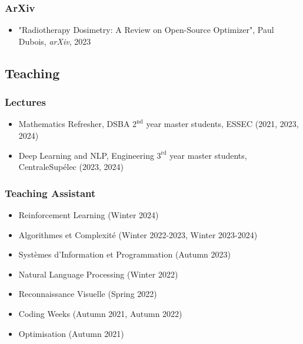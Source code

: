\subsubsection*{ArXiv}
\begin{itemize}
	\item "Radiotherapy Dosimetry: A Review on Open-Source Optimizer",
	Paul Dubois, \textit{arXiv}, 2023
\end{itemize}

\subsection*{Teaching}
\subsubsection*{Lectures}
\begin{itemize}
	\item Mathematics Refresher, DSBA $2^\text{nd}$ year master students, ESSEC (2021, 2023, 2024)
	\item Deep Learning and NLP, Engineering $3^\text{rd}$ year master students, CentraleSupélec (2023, 2024)
\end{itemize}

\subsubsection*{Teaching Assistant}
\begin{itemize}
	\item Reinforcement Learning (Winter 2024)
	\item Algorithmes et Complexité (Winter 2022-2023, Winter 2023-2024)
	\item Systèmes d'Information et Programmation (Autumn 2023)
	\item Natural Language Processing (Winter 2022)
	\item Reconnaissance Visuelle (Spring 2022)
	\item Coding Weeks (Autumn 2021, Autumn 2022)
	\item Optimisation (Autumn 2021)
\end{itemize}

